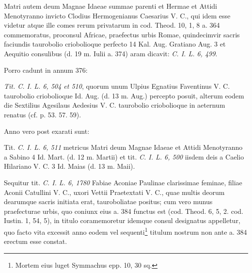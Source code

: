 \documentclass[a4paper, 11pt, oneside, polutonikogreek, german]{article}
\begin{document}
Matri autem deum Magnae Idaeae summae parenti et Hermae et Attidi Menotyranno invicto Clodius Hermogenianus Caesarius V. C., qui idem esse videtur atque ille comes rerum privatarum in cod. Theod. 10, 1, 8 a. 364 commemoratus, proconsul Africae, praefectus urbis Romae, quindecimvir sacris faciundis taurobolio criobolioque perfecto 14 Kal. Aug. Gratiano Aug. 3 et Aequitio consulibus (d. 19 m. Iulii a. 374) aram dicavit: \emph{C. I. L. 6, 499}.

Porro cadunt in annum 376:

\emph{Tit. C. I. L. 6, 504 et 510}, quorum unum Ulpius Egnatius Faventinus V. C. taurobolio criobolioque Id. Aug. (d. 13 m. Aug.) percepto posuit, alterum eodem die Sextilius Agesilaus Aedesius V. C. taurobolio criobolioque in aeternum renatus (cf. p. 53. 57. 59).

Anno vero post exarati sunt:

Tit. \emph{C. I. L. 6, 511} metricus Matri deum Magnae Idaeae et Attidi Menotyranno a Sabino 4 Id. Mart. (d. 12 m. Martii) et tit. \emph{C. I. L. 6, 500} iisdem deis a Caelio Hilariano V. C. 3 Id. Maias (d. 13 m. Maii).

Sequitur tit. \emph{C. I. L. 6, 1780} Fabiae Aconiae Paulinae clarissimae feminae, filiae Aconii Catullini V. C., uxori Vettii Praetextati V. C., quae multis deorum dearumque sacris initiata erat, tauroboliatae positus; cum vero munus praefecturae urbis, quo coniunx eius a. 384 functus est (cod. Theod. 6, 5, 2. cod. Iustin. 1, 54, 5), in titulo coramemoretur idemque consul designatus appelletur, quo facto vita excessit anno eodem vel sequenti\footnote{Mortem eius luget Symmachus epp. 10, 30 sq.} titulum nostrum non ante a. 384 erectum esse constat.
\end{document}
